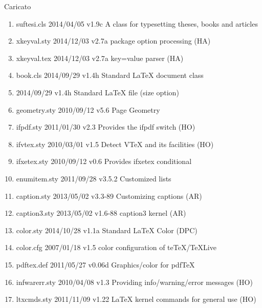 Caricato
\begin{enumerate}
\item suftesi.cls 2014/04/05 v1.9c A class for typesetting theses, books and articles
\item xkeyval.sty 2014/12/03 v2.7a package option processing (HA)
\item xkeyval.tex 2014/12/03 v2.7a key=value parser (HA)
\item book.cls 2014/09/29 v1.4h Standard LaTeX document class
\item {} 2014/09/29 v1.4h Standard LaTeX file (size option)
\item geometry.sty 2010/09/12 v5.6 Page Geometry
\item ifpdf.sty 2011/01/30 v2.3 Provides the ifpdf switch (HO)
\item ifvtex.sty 2010/03/01 v1.5 Detect VTeX and its facilities (HO)
\item ifxetex.sty 2010/09/12 v0.6 Provides ifxetex conditional
\item enumitem.sty 2011/09/28 v3.5.2 Customized lists
\item caption.sty 2013/05/02 v3.3-89 Customizing captions (AR)
\item caption3.sty 2013/05/02 v1.6-88 caption3 kernel (AR)
\item color.sty 2014/10/28 v1.1a Standard LaTeX Color (DPC)
\item color.cfg 2007/01/18 v1.5 color configuration of teTeX/TeXLive
\item pdftex.def 2011/05/27 v0.06d Graphics/color for pdfTeX
\item infwarerr.sty 2010/04/08 v1.3 Providing info/warning/error messages (HO)
\item ltxcmds.sty 2011/11/09 v1.22 LaTeX kernel commands for general use (HO)

\end{enumerate}
